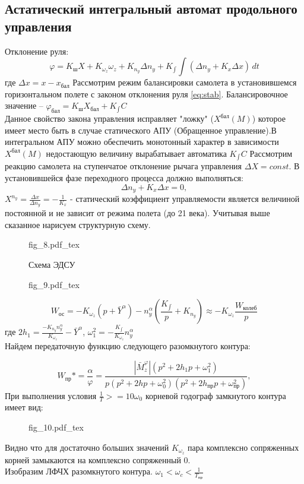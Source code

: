 \documentclass{article}
\begin{document}
\subsection{Астатический интегральный автомат продольного управления}
Отклонение руля:
\begin{equation}
	\varphi = K_\text{ш} X + K_{\omega_z} \omega_z + K_{n_y} \Delta n_y +
	K_{\int} \int (\Delta n_y + K_x \Delta x) \, dt
	\label{eq:stab}
\end{equation}
где $\Delta x = x - x_\text{бал}$
Рассмотрим режим балансировки самолета в установившемся горизонтальном полете с
законом отклонения руля \eqref{eq:stab}.
Балансировочное значение -- $\varphi_\text{бал} = K_\text{ш} X_\text{бал} +
	K_{\int} C$\\
Данное свойство закона управления исправляет "ложку" ($X^\text{бал}(M)$) которое
имеет место быть в случае статического АПУ (Обращенное управление).В
интегральном АПУ можно обеспечить монотонный характер в зависимости
$X^\text{бал} (M)$ недостающую величину вырабатывает автоматика $K_{\int}C$
Рассмотрим реакцию самолета на ступенчатое отклонение рычага управления $\Delta
	X = const$. В установившейся фазе переходного процесса должно выполняться:
\[
	\Delta n_y + K_x \Delta x = 0,
\]
$ X^{n_y} = \frac{\Delta x}{\Delta n_y} = -\frac{1}{K_x} $ - статический
коэффициент управляемости является величиной постоянной и не зависит от режима
полета (до 21 века).
Учитывая выше сказанное нарисуем структурную схему.
\begin{figure}[H]
	\begin{minipage}{\textwidth}
		\centering
		{fig_8.pdf_tex}
	\end{minipage}
	\caption{Схема ЭДСУ}
\end{figure}

\begin{figure}[H]
	\begin{minipage}{\textwidth}
		\centering
		{fig_9.pdf_tex}
	\end{minipage}
\end{figure}


\[
	W_\text{ос} = -K_{\omega_z} (p+\bar{Y}^\alpha) - n_y^\alpha
	(\frac{K_{\int}}{p} + K_{n_y})
	\approx -K_{\omega_z}\frac{W_\text{колеб}}{p}
\]
где $2h_1 = \frac{-K_{n_y} n_y^\alpha}{K_{\omega_z}} - \bar{Y}^\alpha$,
$\omega_1^2 = -\frac{K_{\int}} {K_{\omega_z}} n_y^\alpha $\\
Найдем передаточную функцию следующего разомкнутого контура:

\[
	W_\text{пр}* = {\frac{\alpha}{\varphi}} = \frac{|\bar{M}_z^\varphi| (p^2 +
		2h_1 p + \omega_1^2)} {p(p^2 + 2 hp + \omega_0^2) (p^2 + 2h_\text{пр}p +
		\omega_\text{пр}^2)},
\]
При выполнения условия $\frac{1}{T} >= 10 \omega_0$ корневой годограф
замкнутого контура имеет вид:
\begin{figure}[H]
	\centering
	{fig_10.pdf_tex}
\end{figure}
Видно что для достаточно больших значений $K_{\omega_z}$ пара комплексно
сопряженных корней замыкаются на комплексно сопряженный 0.\\
Изобразим ЛФЧХ разомкнутого контура.
$\omega_1 < \omega_c < \frac{1}{T_\text{пр}}$
\end{document}
